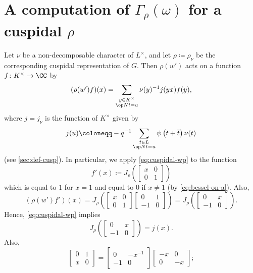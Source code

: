 \documentclass[../main.tex]{subfiles}
\begin{document}
\section{A computation of \texorpdfstring{$\Gamma_\rho(\omega)$}{ Gamma rho(omega)} for a cuspidal \texorpdfstring{$\rho$}{ rho}}
Let $\nu$ be a non-decomposable character of $L^\times$, and let $\rho\coloneqq\rho_\nu$ be the corresponding cuspidal representation of $G$. Then $\rho(w')$ acts on a function $f\colon K^\times\to\CC$ by
\begin{equation}
	(\rho(w')f)(x)=\sum_{\substack{y\in K^\times\\\op Nt=u}}\nu(y)^{-1}j(yx)f(y), \label{eq:cuspidal-wp}
\end{equation}
where $j=j_\nu$ is the function of $K^\times$ given by
\[j(u)\coloneqq -q^{-1}\sum_{\substack{t\in L\\\op Nt=u}}\psi\left(t+\overline t\right)\nu(t)\]
(see \cref{sec:def-cusp}). In particular, we apply \eqref{eq:cuspidal-wp} to the function
\[f'(x)\coloneqq J_\rho\left(\begin{bmatrix}
	x & 0 \\
	0 & 1
\end{bmatrix}\right)\]
which is equal to $1$ for $x=1$ and equal to $0$ if $x\ne1$ (by \eqref{eq:bessel-on-a}). Also,
\[(\rho(w')f')(x)=J_\rho\left(\begin{bmatrix}
	x & 0 \\
	0 & 1
\end{bmatrix}\begin{bmatrix}
	0 & 1 \\
	-1 & 0
\end{bmatrix}\right)=J_\rho\left(\begin{bmatrix}
	0 & x \\
	-1 & 0
\end{bmatrix}\right).\]
Hence, \eqref{eq:cuspidal-wp} implies
\[J_\rho\left(\begin{bmatrix}
	0 & x \\
	-1 & 0
\end{bmatrix}\right)=j(x).\]
Also,
\[\begin{bmatrix}
	0 & 1 \\
	x & 0
\end{bmatrix}=\begin{bmatrix}
	0 & -x^{-1} \\
	-1 & 0
\end{bmatrix}\begin{bmatrix}
	-x & 0 \\
	0 & -x
\end{bmatrix};\]
\end{document}
